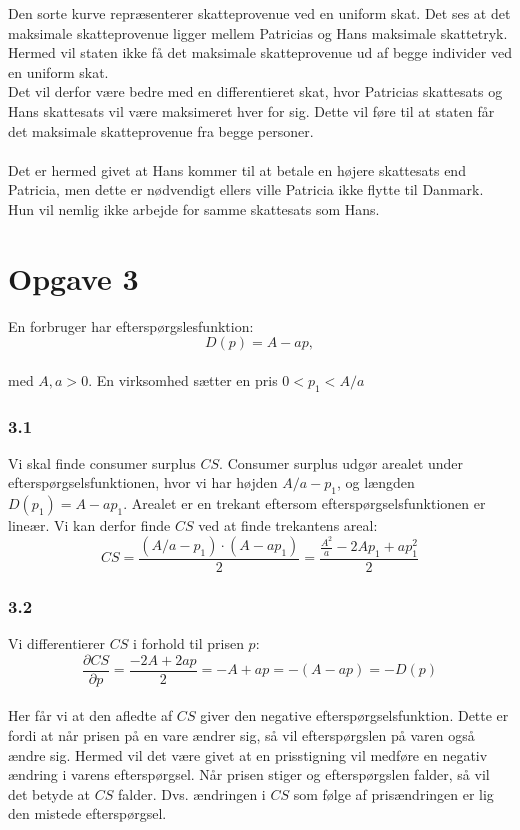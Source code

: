 \documentclass[a4paper, 12pt]{article}
\begin{document}
Den sorte kurve repræsenterer skatteprovenue ved en uniform skat. Det ses at det maksimale skatteprovenue ligger mellem Patricias og Hans maksimale skattetryk. Hermed vil staten ikke få det maksimale skatteprovenue ud af begge individer ved en uniform skat. 
\\
Det vil derfor være bedre med en differentieret skat, hvor Patricias skattesats og Hans skattesats vil være maksimeret hver for sig. Dette vil føre til at staten får det maksimale skatteprovenue fra begge personer. 
\\\\
Det er hermed givet at Hans kommer til at betale en højere skattesats end Patricia, men dette er nødvendigt ellers ville Patricia ikke flytte til Danmark. Hun vil nemlig ikke arbejde for samme skattesats som Hans. 


\section*{Opgave 3}
En forbruger har efterspørgslesfunktion:
$$D(p)=A-ap,$$
\\
med $A,a > 0$. En virksomhed sætter en pris $0 < p_{1} < A / a$

\subsubsection*{3.1}
Vi skal finde consumer surplus $CS$. Consumer surplus udgør arealet under efterspørgselsfunktionen, hvor vi har højden $A/a - p_{1}$, og længden $D(p_{1})= A -ap_{1}$. Arealet er en trekant eftersom efterspørgselsfunktionen er lineær. Vi kan derfor finde $CS$ ved at finde trekantens areal:
$$CS = \dfrac{(A / a - p_{1}) \cdot (A - ap_{1})}{2} = \dfrac{\frac{A^{2}}{a} - 2Ap_{1} + ap_{1}^{2}}{2} $$

\subsubsection*{3.2}
Vi differentierer $CS$ i forhold til prisen $p$:
$$\dfrac{\partial CS}{\partial p} = \dfrac{-2A + 2ap}{2} = -A + ap = -(A-ap) = -D(p)$$
\\
Her får vi at den afledte af $CS$ giver den negative efterspørgselsfunktion. Dette er fordi at når prisen på en vare ændrer sig, så vil efterspørgslen på varen også ændre sig. Hermed vil det være givet at en prisstigning vil medføre en negativ ændring i varens efterspørgsel. Når prisen stiger og efterspørgslen falder, så vil det betyde at $CS$ falder. Dvs. ændringen i $CS$ som følge af prisændringen er lig den mistede efterspørgsel.
\end{document}
